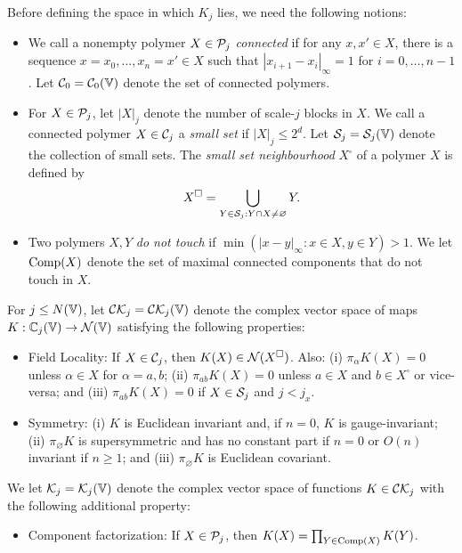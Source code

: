 Before defining the space in which $K_j$ lies, we need the following notions:
\begin{itemize}
\item
We call a nonempty polymer $X\in \mathcal{P}_j$ \emph{connected}
if for any $x, x' \in X$, there is a sequence
$x = x_0, \ldots, x_n = x' \in X$ such that
$|x_{i+1} - x_i|_\infty = 1$ for $i = 0, \ldots, n - 1$.
Let $\mathcal{C}_0 = \mathcal{C}_0(\mathbb{V})$ denote the set of connected polymers.

\item
For $X \in \mathcal{P}_j$, let $|X|_j$ denote the number of scale-$j$ blocks in $X$.
We call a connected polymer $X\in\mathcal{C}_j$ a \emph{small set} if $|X|_j \le 2^d$.
Let $\mathcal{S}_j = \mathcal{S}_j(\mathbb{V})$ denote the collection of small sets.
The \emph{small set neighbourhood} $X^\square$ of a polymer $X$ is defined by
\begin{equation}
\label{e:ssn}
X^\Box = \bigcup_{Y\in\mathcal{S}_j : Y \cap X \ne \varnothing} Y.
\end{equation}

\item
Two polymers $X, Y$ \emph{do not touch} if $\min(|x - y|_\infty : x \in X, y \in Y) > 1$.
We let ${\rm Comp}(X)$ denote the set of maximal connected components that do not touch
in $X$.
\end{itemize}

\begin{defn}
For $j \le N(\mathbb{V})$, let $\mathcal{C}\mathcal{K}_j = \mathcal{C}\mathcal{K}_j(\mathbb{V})$ denote the complex
vector space of maps $K : \mathbb{C}_j(\mathbb{V}) \rightarrow \mathcal{N}(\mathbb{V})$ satisfying the following
properties:
\begin{itemize}
\item
Field Locality: If $X \in \mathcal{C}_j$, then $K(X) \in \mathcal{N}(X^\square)$.
Also: (i) $\pi_\alpha K(X) = 0$ unless $\alpha \in X$ for $\alpha = a, b$;
(ii) $\pi_{ab} K(X) = 0$ unless $a\in X$ and $b \in X^\square$ or vice-versa;
and (iii) $\pi_{ab} K(X) = 0$ if $X \in \mathcal{S}_j$ and $j < j_x$.

\item
Symmetry: (i) $K$ is Euclidean invariant and, if $n = 0$, $K$ is gauge-invariant;
(ii) $\pi_\varnothing K$ is supersymmetric and has no constant part if $n = 0$
or $O(n)$ invariant if $n \ge 1$;
and (iii) $\pi_\varnothing K$ is Euclidean covariant.
\end{itemize}
We let $\mathcal{K}_j = \mathcal{K}_j(\mathbb{V})$ denote the complex vector space of functions
$K \in \mathcal{C}\mathcal{K}_j$ with the following additional property:
\begin{itemize}
\item
Component factorization: If $X \in \mathcal{P}_j$, then $K(X) = \prod_{Y\in{\rm Comp}(X)} K(Y)$.
\end{itemize}
\end{defn}

